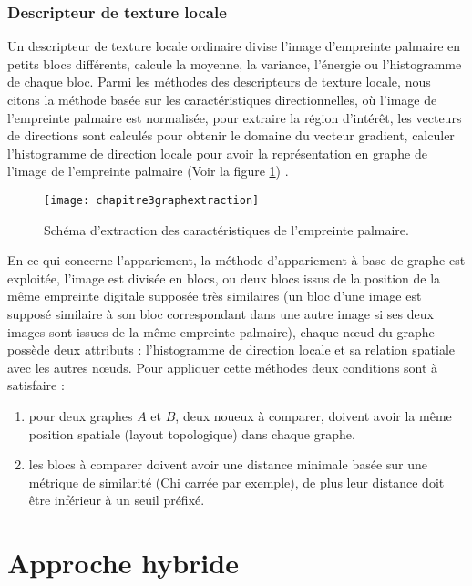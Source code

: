 \subsubsection{Descripteur de texture locale}
Un descripteur de texture locale ordinaire divise l’image d’empreinte palmaire en petits blocs différents, calcule la moyenne, la variance, l’énergie ou l’histogramme de chaque bloc.
Parmi les méthodes des descripteurs de texture locale, nous citons la méthode basée sur les caractéristiques directionnelles, où l’image de l’empreinte palmaire est normalisée, pour extraire la région d’intérêt, les vecteurs de directions sont calculés pour obtenir le domaine du vecteur gradient, calculer l’histogramme de direction locale pour avoir la représentation en graphe de l’image de l’empreinte palmaire (Voir la figure \ref{fig:chapitre3graphextraction}) \citep{han2007palmprint}.
\begin{center}
	\begin{figure}[H]
		\centering
		\texttt{[image: chapitre3graphextraction]}
		\caption{Schéma d'extraction des caractéristiques de l'empreinte palmaire.}
		\label{fig:chapitre3graphextraction}
	\end{figure}
\end{center}

En ce qui concerne l’appariement, la méthode d’appariement à base de graphe est exploitée, l’image est divisée en blocs, ou deux blocs issus de la position de la même empreinte digitale supposée très similaires (un bloc d’une image est supposé similaire à son bloc correspondant dans une autre image si ses deux images sont issues de la même empreinte palmaire), chaque nœud du graphe possède deux attributs : l’histogramme de direction locale et sa relation spatiale avec les autres nœuds.
Pour appliquer cette méthodes deux conditions sont à satisfaire \citep{han2007palmprint}:
\begin{enumerate}
	\item pour deux graphes $ A $ et $ B $, deux noueux à comparer, doivent avoir la même position spatiale (layout topologique) dans chaque graphe.
	\item les blocs à comparer doivent avoir une distance minimale basée sur une métrique de similarité (Chi carrée par exemple), de plus leur distance doit être inférieur à un seuil préfixé.
\end{enumerate}

\section{Approche hybride}

